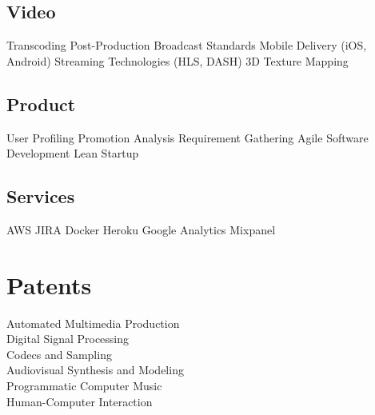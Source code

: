 \documentclass[letterpaper]{deedy-resume} %
\begin{document}
\begin{minipage}[t]{0.33\textwidth}
\sectionspace %
 
\subsection{Video}


Transcoding \textbullet{} Post-Production \textbullet{} Broadcast Standards \textbullet{} Mobile Delivery (iOS, Android) \textbullet{} Streaming Technologies (HLS, DASH) \textbullet{}
 3D Texture Mapping

\sectionspace %
 
\subsection{Product}

User Profiling \textbullet{} Promotion Analysis \textbullet{} Requirement Gathering \textbullet{} Agile Software Development \textbullet{} Lean Startup

\sectionspace %
 
\subsection{Services}

AWS \textbullet{} JIRA \textbullet{} Docker \textbullet{} Heroku \textbullet{} Google Analytics \textbullet{} Mixpanel 


\sectionspace %


\section{Patents}

Automated Multimedia Production \\
Digital Signal Processing \\
Codecs and Sampling \\
Audiovisual Synthesis and Modeling \\
Programmatic Computer Music \\
Human-Computer Interaction


\end{minipage}
\end{document}

